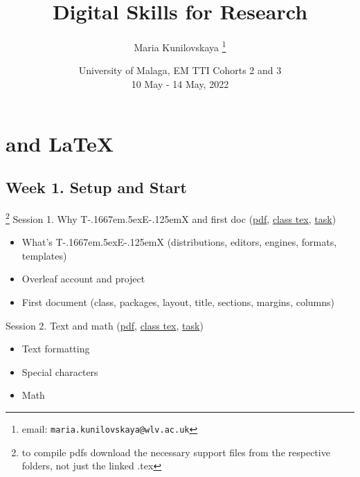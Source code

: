 \documentclass[a4paper,12pt]{article} %
\title{\vspace{-4em} Digital Skills for Research}
\author{Maria Kunilovskaya%
	\thanks{email: \texttt{maria.kunilovskaya@wlv.ac.uk}}}
\date{%
	University of Malaga, EM TTI Cohorts 2 and 3\\%
	
	10 May - 14 May, 2022}
\def\TeX{{\rm T\kern-.1667em\lower.5ex\hbox{E}\kern-.125emX }}
\begin{document}
	
\clearpage\maketitle
\thispagestyle{empty}	
\maketitle

\vspace{-2em}

\section{{\color{red}\TeX and \LaTeX}}

\subsection{Week 1. Setup and Start}\footnote{to compile pdfs download the necessary support files from the respective folders, not just the linked .tex}
	Session 1. Why \TeX and first doc (\href{https://canvas.wlv.ac.uk/courses/33429/files/folder/latex_mendeley_github/w1-3_latex?preview=4622172}{pdf}, \href{https://github.com/kunilovskaya/dskills_workshop/blob/main/w1_latex_basics/session1.tex}{class tex}, \href{https://github.com/kunilovskaya/dskills_workshop/blob/main/w1_latex_basics/task1.tex}{task})
		\begin{itemize}
			\item What's \TeX (distributions, editors, engines, formats, templates)
			\item Overleaf account and project
			\item First document (class, packages, layout, title, sections, margins, columns)
		\end{itemize} 
	Session 2. Text and math (\href{https://canvas.wlv.ac.uk/courses/33429/files/folder/latex_mendeley_github/w1-3_latex?preview=4623463}{pdf}, \href{https://github.com/kunilovskaya/dskills_workshop/blob/main/w1_latex_basics/session1.tex}{class tex}, \href{https://github.com/kunilovskaya/dskills_workshop/blob/main/w1_latex_basics/task2.pdf}{task})
		\begin{itemize}
			\item Text formatting
			\item Special characters
			\item Math
		\end{itemize}
\end{document}

